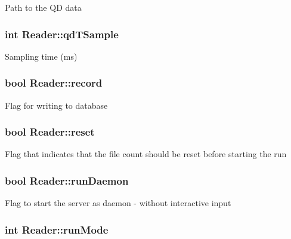 Path to the Q\-D data \hypertarget{classReader_a69f380acc4c2b439f1cd940b12349d92}{
\subsubsection[{qd\-T\-Sample}]{\setlength{\rightskip}{0pt plus 5cm}int Reader\-::qd\-T\-Sample\hspace{0.3cm}{\ttfamily [private]}}}\label{classReader_a69f380acc4c2b439f1cd940b12349d92}
Sampling time (ms) \hypertarget{classReader_acfb61762011f4aa995126c9e8c1950c3}{
\subsubsection[{record}]{\setlength{\rightskip}{0pt plus 5cm}bool Reader\-::record\hspace{0.3cm}{\ttfamily [private]}}}\label{classReader_acfb61762011f4aa995126c9e8c1950c3}
Flag for writing to database \hypertarget{classReader_ac7fb1595fa93f70c58656bff11091f94}{
\subsubsection[{reset}]{\setlength{\rightskip}{0pt plus 5cm}bool Reader\-::reset\hspace{0.3cm}{\ttfamily [private]}}}\label{classReader_ac7fb1595fa93f70c58656bff11091f94}
Flag that indicates that the file count should be reset before starting the run \hypertarget{classReader_a08302c0ae536dd0d0d2de37143eb7a94}{
\subsubsection[{run\-Daemon}]{\setlength{\rightskip}{0pt plus 5cm}bool Reader\-::run\-Daemon\hspace{0.3cm}{\ttfamily [private]}}}\label{classReader_a08302c0ae536dd0d0d2de37143eb7a94}
Flag to start the server as daemon -\/ without interactive input \hypertarget{classReader_a3fb6ef9d55ca8c9d23e0bf6be5796583}{
\subsubsection[{run\-Mode}]{\setlength{\rightskip}{0pt plus 5cm}int Reader\-::run\-Mode\hspace{0.3cm}{\ttfamily [private]}}}\label{classReader_a3fb6ef9d55ca8c9d23e0bf6be5796583}
